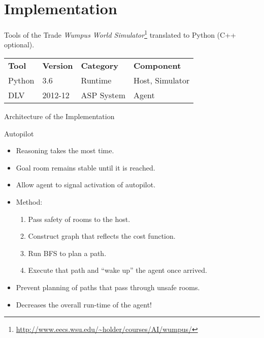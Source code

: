 \documentclass[smaller,dvipsnames,ratio=169,10pt]{beamer}
\begin{document}
  \section{Implementation}

  \begin{frame}{Tools of the Trade}
  \emph{Wumpus World Simulator}\footnote{\url{http://www.eecs.wsu.edu/~holder/courses/AI/wumpus/}} translated to Python (C++ optional).

  \begin{center}
  \begin{tabular}{llll}
    \textbf{Tool} & \textbf{Version} & \textbf{Category} & \textbf{Component} \\
    Python & 3.6 & Runtime & Host, Simulator \\
    DLV & 2012-12 & ASP System & Agent\\
  \end{tabular}
  \end{center}
  \end{frame}  
  
  \begin{frame}{Architecture of the Implementation}
		\resizebox{1.0\textwidth}{0.55\textheight}{
			
		}
  \end{frame}

  \begin{frame}{Autopilot}
  	\begin{itemize}
  		\item Reasoning takes the most time.
  		\item Goal room remains stable until it is reached.
  		\item Allow agent to signal activation of autopilot.
  		\item Method: \begin{enumerate}
  		\item Pass safety of rooms to the host.
  		\item Construct graph that reflects the cost function.
  		\item Run BFS to plan a path.
  		\item Execute that path and \enquote{wake up} the agent once arrived.
  		\end{enumerate}
  		\item Prevent planning of paths that pass through unsafe rooms.		  		
		\item Decreases the overall run-time of the agent!
  	\end{itemize}
  \end{frame}
  
\end{document}

